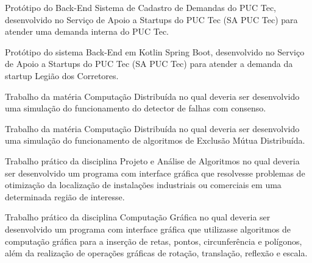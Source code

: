 
Protótipo do Back-End Sistema de Cadastro de Demandas do PUC Tec, desenvolvido no Serviço de Apoio a Startups do PUC Tec (SA PUC Tec) para atender uma demanda interna do PUC Tec.\\
\divider

Protótipo do sistema Back-End em Kotlin Spring Boot, desenvolvido no Serviço de Apoio a Startups do PUC Tec (SA PUC Tec) para atender a demanda da startup Legião dos Corretores.\\
\divider

Trabalho da matéria Computação Distribuída no qual deveria ser desenvolvido uma simulação do funcionamento do detector de falhas com consenso.\\
\divider

Trabalho da matéria Computação Distribuída no qual deveria ser desenvolvido uma simulação do funcionamento de algoritmos de Exclusão Mútua Distribuída.\\
\divider

Trabalho prático da disciplina Projeto e Análise de Algoritmos no qual deveria ser desenvolvido um programa com interface gráfica que resolvesse problemas de otimização da localização de instalações industriais ou comerciais em uma determinada região de interesse.\\
\divider

Trabalho prático da disciplina Computação Gráfica no qual deveria ser desenvolvido um programa com interface gráfica que utilizasse algoritmos de computação gráfica para a inserção de retas, pontos, circunferência e polígonos, além da realização de operações gráficas de rotação, translação, reflexão e escala.\\
\divider

